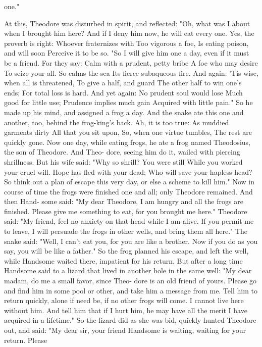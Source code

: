 \documentclass{book}
\begin{document}
one."

At this, Theodore was disturbed in spirit, and
reflected: "Oh, what was I about when I brought
him here? And if I deny him now, he will eat every
one. Yes, the proverb is right:
Whoever fraternizes with
Too vigorous a foe,
Is eating poison, and will soon
Perceive it to be so.
"So I will give him one a day, even if it must be a
friend. For they say:
Calm with a prudent, petty bribe
A foe who may desire
To seize your all. So calms the sea
Its fierce subaqueous fire.
And again:
'Tis wise, when all is threatened,
To give a half, and guard
The other half to win one's ends;
For total loss is hard.
And yet again:
No prudent soul would lose
Much good for little use;
Prudence implies much gain
Acquired with little pain."
So he made up his mind, and assigned a frog a day.
And the snake ate this one and another, too, behind
the frog-king's back. Ah, it is too true:
As muddied garments dirty
All that you sit upon,
So, when one virtue tumbles,
The rest are quickly gone.
Now one day, while eating frogs, he ate a frog
named Theodosius, the son of Theodore. And Theo-
dore, seeing him do it, wailed with piercing shrillness.
But his wife said:
"Why so shrill? You were still
While you worked your cruel will.
Hope has fled with your dead;
Who will save your hapless head?
So think out a plan of escape this very day, or else a
scheme to kill him."
Now in course of time the frogs were finished one
and all; only Theodore remained. And then Hand-
some said: "My dear Theodore, I am hungry and
all the frogs are finished. Please give me something
to eat, for you brought me here."
Theodore said: "My friend, feel no anxiety on
that head while I am alive. If you permit me to leave,
I will persuade the frogs in other wells, and bring
them all here."
The snake said: "Well, I can't eat you, for you
are like a brother. Now if you do as you say, you
will be like a father."
So the frog planned his escape, and left the well,
while Handsome waited there, impatient for his
return. But after a long time Handsome said to a
lizard that lived in another hole in the same well:
"My dear madam, do me a small favor, since Theo-
dore is an old friend of yours. Please go and find him
in some pool or other, and take him a message from
me. Tell him to return quickly, alone if need be, if
no other frogs will come. I cannot live here without
him. And tell him that if I hurt him, he may have
all the merit I have acquired in a lifetime."
So the lizard did as she was bid, quickly hunted
Theodore out, and said: "My dear sir, your friend
Handsome is waiting, waiting for your return. Please
\end{document}
